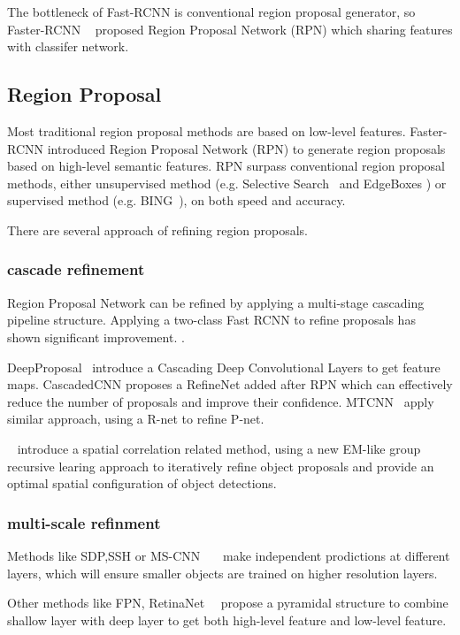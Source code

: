 \documentclass[10pt,twocolumn,letterpaper]{article}
\begin{document}
The bottleneck of Fast-RCNN is conventional region proposal generator, so Faster-RCNN ~\cite{fasterRCNN} proposed Region Proposal Network (RPN) which sharing features with classifer network.


\subsection{Region Proposal}
Most traditional region proposal methods are based on low-level features. Faster-RCNN introduced Region Proposal Network (RPN) to generate region proposals based on high-level semantic features. RPN surpass conventional region proposal methods, either unsupervised method (e.g. Selective Search~\cite{SelectiveSearch} and EdgeBoxes \cite{EdgeBoxes}) or supervised method (e.g. BING~\cite{BING}), on both speed and accuracy.

There are several approach of refining region proposals.

\subsubsection{cascade refinement}
Region Proposal Network can be refined by applying a multi-stage cascading pipeline structure. Applying a two-class Fast RCNN to refine proposals has shown significant improvement. \cite{CRAFT} \cite{CraftingGBD} \cite{DeepBox}.  

DeepProposal~\cite{DeepProposal} introduce a Cascading Deep Convolutional Layers to get feature maps. CascadedCNN \cite{Cascadedcnn} proposes a RefineNet added after RPN which can effectively reduce the number of proposals and improve their confidence. MTCNN~\cite{MTCNN} apply similar approach, using a R-net to refine P-net.

~\cite{GroupRecursive} introduce a spatial correlation related method, using a new EM-like group recursive learing approach to iteratively refine object proposals and provide an optimal spatial configuration of object detections.
\subsubsection{multi-scale refinment}
Methods like SDP,SSH or MS-CNN ~\cite{SDP}~\cite{SSH}~\cite{MSCNN}make independent prodictions at different layers, which will ensure smaller objects are trained on higher resolution layers.


Other methods like FPN, RetinaNet~\cite{FPN}~\cite{RetinaNet} propose a pyramidal structure to combine shallow layer with deep layer to get both high-level feature and low-level feature.
\end{document}
